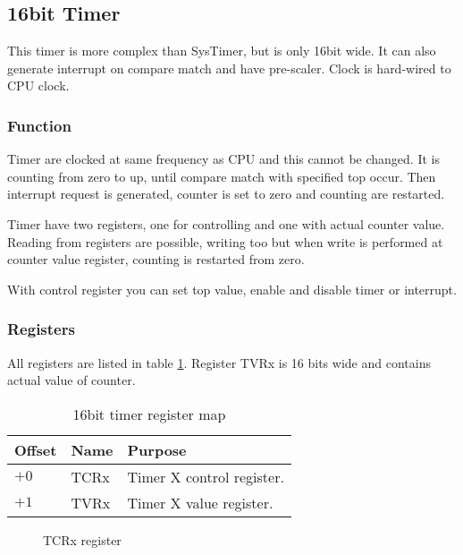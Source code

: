 \subsection{16bit Timer}

This timer is more complex than SysTimer, but is only 16bit wide. It 
can also generate interrupt on compare match and have pre-scaler. Clock 
is hard-wired to CPU clock.

\subsubsection{Function}

Timer are clocked at same frequency as CPU and this cannot be changed. It
is counting from zero to up, until compare match with specified top occur. Then
interrupt request is generated, counter is set to zero and counting are restarted.

Timer have two registers, one for controlling and one with actual counter value. Reading
from registers are possible, writing too but when write is performed at counter
value register, counting is restarted from zero.

With control register you can set top value, enable and disable timer or interrupt.

\subsubsection{Registers}

All registers are listed in table \ref{tab:timer_reg_map}. Register TVRx is 16
bits wide and  contains  actual value of counter. 

\begin{table}[h]
    \centering
    \begin{tabular}{|l|l|l|}
        \hline
        \textbf{Offset} & \textbf{Name} & \textbf{Purpose}            \\ \hline
        $+0$            & TCRx          & Timer X control register.    \\ \hline
        $+1$            & TVRx          & Timer X value register.      \\ \hline
    \end{tabular}
    \caption{16bit timer register map}
    \label{tab:timer_reg_map}
\end{table}

\begin{figure}[H]
    \centering
    \caption{TCRx register}
    \label{fig:tcr_reg}
\end{figure}

